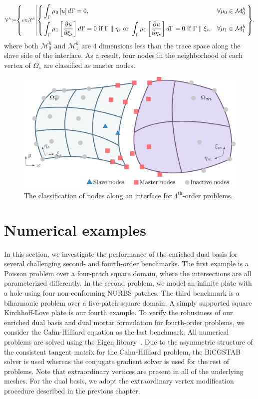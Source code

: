 \begin{equation}\scriptstyle
	\mathcal{V}^h\coloneqq \left\{ v\in \mathcal{X}^h \left| \quad  \\\left\{\begin{alignedat}{2}
		&\int_{\Gamma} \mu_0 \left[ u \right] d \Gamma=0, &&\forall \mu_0\in \mathcal{M}_0^h\\
		&\int_{\Gamma} \mu_1 \left[ \frac{\partial u}{ \partial \xi_s} \right] d \Gamma=0\text{ if }\Gamma\parallel\eta_s\text{ or }\int_{\Gamma} \mu_1 \left[ \frac{\partial u}{ \partial \eta_s} \right] d\Gamma=0\text{ if }\Gamma\parallel\xi_s,\quad&&\forall\mu_1\in \mathcal{M}_1^h
	\end{alignedat}\right. \right. \right\},
\end{equation}
where both $\mathcal{M}_0^h$ and $\mathcal{M}_1^h$ are $4$ dimensions less than the trace space along the slave side of the interface. As a result, four nodes in the neighborhood of each vertex of $\Omega_s$ are classified as master nodes.

\begin{figure}[ht]
	\center
	\includegraphics[width=.7\columnwidth]{two_patch_domain_biharmonic}
	\caption{The classification of nodes along an interface for $4^\text{th}$-order problems.}
\end{figure}


\section{Numerical examples}\label{sec:examples}

In this section, we investigate the performance of the enriched dual basis for several challenging second- and fourth-order benchmarks. The first example is a Poisson problem over a four-patch square domain, where the intersections are all parameterized differently. In the second problem, we model an infinite plate with a hole using four non-conforming NURBS patches. The third benchmark is a biharmonic problem over a five-patch square domain. A simply supported square Kirchhoff-Love plate is our fourth example. To verify the robustness of our enriched dual basis and dual mortar formulation for fourth-order problems, we consider the Cahn-Hilliard equation as the last benchmark. All numerical problems are solved using the Eigen library~\cite{eigenweb}. Due to the asymmetric structure of the consistent tangent matrix for the Cahn-Hilliard problem, the BiCGSTAB solver is used whereas the conjugate gradient solver is used for the rest of problems. Note that extraordinary vertices are present in all of the underlying meshes. For the \Bezier dual basis, we adopt the extraordinary vertex modification procedure described in the previous chapter.\par

